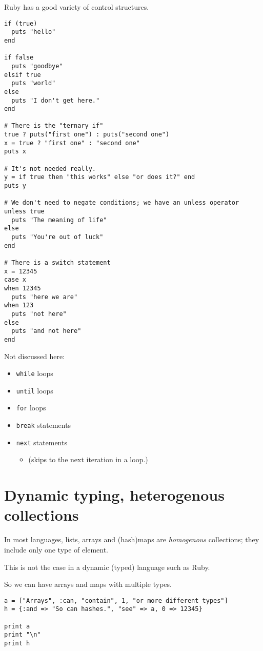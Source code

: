 \documentclass[11pt]{article}
\begin{document}
Ruby has a good variety of control structures.
\begin{verbatim}
if (true)
  puts "hello"
end

if false
  puts "goodbye"
elsif true
  puts "world"
else
  puts "I don't get here."
end

# There is the "ternary if"
true ? puts("first one") : puts("second one")
x = true ? "first one" : "second one"
puts x

# It's not needed really.
y = if true then "this works" else "or does it?" end
puts y

# We don't need to negate conditions; we have an unless operator
unless true
  puts "The meaning of life"
else
  puts "You're out of luck"
end

# There is a switch statement
x = 12345
case x
when 12345
  puts "here we are"
when 123
  puts "not here"
else
  puts "and not here"
end
\end{verbatim}

Not discussed here:
\begin{itemize}
\item \texttt{while} loops
\item \texttt{until} loops
\item \texttt{for} loops
\item \texttt{break} statements
\item \texttt{next} statements
\begin{itemize}
\item (skips to the next iteration in a loop.)
\end{itemize}
\end{itemize}

\section{Dynamic typing, heterogenous collections}
\label{sec:org0d94f5b}
In most languages, lists, arrays and (hash)maps
are \emph{homogenous} collections; they include only one type of element.

This is not the case in a dynamic (typed) language
such as Ruby.

So we can have arrays and maps with multiple types.
\begin{verbatim}
a = ["Arrays", :can, "contain", 1, "or more different types"] 
h = {:and => "So can hashes.", "see" => a, 0 => 12345}

print a
print "\n"
print h
\end{verbatim}
\end{document}

